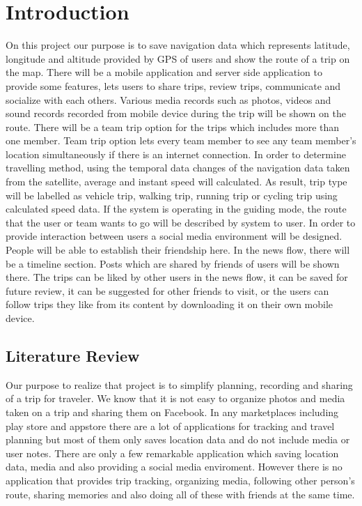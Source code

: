 \chapter{Introduction}
On this project our purpose is to save navigation data which represents latitude, longitude and altitude provided by GPS of users and show the route of a trip on the map. There will be a mobile application and server side application to provide some features, lets users to share trips, review trips, communicate and socialize with each others. Various media records such as photos, videos and sound records recorded from mobile device during the trip will be shown on the route. There will be a team trip option for the trips which includes more than one member. Team trip option lets every team member to see any team member's location simultaneously if there is an internet connection. In order to determine travelling method, using the temporal data changes of the navigation data taken from the satellite, average and instant speed will calculated. As result, trip type will be labelled as vehicle trip, walking trip, running trip or cycling trip using calculated speed data. If the system is operating in the guiding mode, the route that the user or team wants to go will be described by system to user. In order to provide interaction between users a social media environment will be designed. People will be able to establish their friendship here. In the news flow, there will be a timeline section. Posts which are shared by friends of users will be shown there. The trips can be liked by other users in the news flow, it can be saved for future review, it can be suggested for other friends to visit, or the users can follow trips they like from its content by downloading it on their own mobile device.
\section{Literature Review}
Our purpose to realize that project is to simplify planning, recording and sharing of a trip for traveler. We know that it is not easy to organize photos and media taken on a trip and sharing them on Facebook. In any marketplaces including play store and appstore there are a lot of applications for tracking and travel planning but most of them only saves location data and do not include media or user notes. There are only a few remarkable application which saving location data, media and also providing a social media enviroment. However there is no application that provides trip tracking, organizing media, following other person's route, sharing memories and also doing all of these with friends at the same time. 

